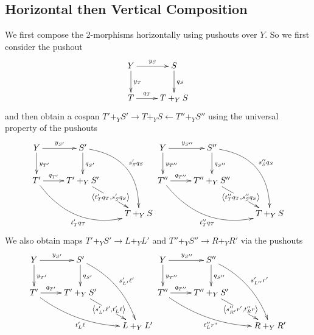 \documentclass[12pt]{article}
\renewcommand{\(}{\left(}
\renewcommand{\)}{\right)}
\renewcommand{\{}{\left\lbrace}
\renewcommand{\}}{\right\rbrace}
\theoremstyle{remark}
\theoremstyle{definition}
\begin{document}
\subsection*{Horizontal then Vertical Composition}

We first compose the 2-morphisms horizontally using pushouts over $Y$.  So we first consider the pushout
\begin{equation} \label{Diag:HV_T+_YSPushout}
\xymatrix{
		Y 
			\ar[r]^{y_S}
			\ar[d]^{y_T} &
		S 
			\ar[d]^{q_{S}} \\
		T 
			\ar[r]^-{q_{T}} &
		T +_Y S
}
\end{equation}
and then obtain a cospan $T'+_Y S' \rightarrow T +_Y S \leftarrow T'' +_Y S''$ using the universal property of the pushouts
\begin{equation} \label{Diag:HV_MapsToT+_YSPushouts}
	\xymatrix{
		Y 
			\ar[r]^{y_{S'}}
			\ar[d]^{y_{T'}} &
		S' 
			\ar[d]^{q_{S'}} 
			\ar@/^2pc/[ddr]^{s'_Sq_S} &
		{}	\\
		T' 
			\ar[r]^-{q_{T'}} 
			\ar@/_2pc/[drr]_{t'_Tq_T} &
		T' +_Y S' 
			\ar[dr]|{\left\langle t'_Tq_T, s'_Sq_S \right\rangle } &
		{} \\
		{} &
		{} &
		T +_Y S
	}
	\xymatrix{
		Y 
			\ar[r]^{y_{S''}} 
			\ar[d]^{y_{T''}} &
		S'' 
			\ar[d]^{q_{S''}} 
			\ar@/^2pc/[ddr]^{s''_Sq_S} &
		{} \\
		T'' 
			\ar[r]^-{q_{T''}} 
			\ar@/_2pc/[drr]_{t''_Tq_T} &
		T'' +_Y S'' 
			\ar[dr]|{\left\langle t''_Tq_T, s''_Sq_S \right\rangle } &
		{} \\
		{} &
		{} &
		T +_Y S
	}
\end{equation}
We also obtain maps $T' +_Y S' \rightarrow L +_Y L'$ and $T'' +_Y S'' \rightarrow R +_Y R'$ via the pushouts
\begin{equation} \label{Diag:HV_MapsToLRPushouts}
	\xymatrix{
		Y 
			\ar[r]^{y_{S'}}
			\ar[d]^{y_{T'}} &
		S' 
			\ar[d]^{q_{S'}} 
			\ar@/^1pc/[ddr]^{s'_{L'}\ell'} &
		{} \\
		T' 
			\ar[r]^-{q_{T'}}
			\ar@/_1pc/[drr]_{t'_{L}\ell} &
		T' +_Y S' 
			\ar[dr]|{\left\langle s'_{L'}\ell', t'_{L}\ell  \right\rangle }&
		{} \\
		{} &
		{} &
		L +_Y L'
	}
	\xymatrix{
		Y 
			\ar[r]^{y_{S''}} 
			\ar[d]^{y_{T''}} &
		S'' 
			\ar[d]^{q_{S''}} 
			\ar@/^1pc/[ddr]^{s'_{L''}r'} &
		{} \\
		T'' 
			\ar[r]^-{q_{T''}} 
			\ar@/_1pc/[drr]_{t''_{L}r"} &
		T'' +_Y S' 
			\ar[dr]|{\left\langle s''_{R'}r', t''_{R}r  \right\rangle } &
		{} \\
		{} &
		{} &
		R +_Y R'
	}
\end{equation}
\end{document}
